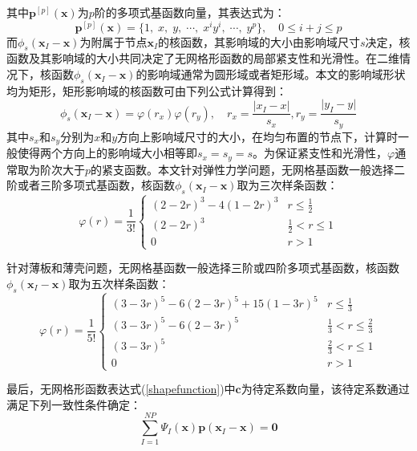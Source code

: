 其中$\pmb{p}^{[p]}(\pmb{x})$为$p$阶的多项式基函数向量，其表达式为：
\begin{equation}
    \pmb{p}^{[p]}(\pmb{x})=\{1,\;x,\;y,\;\dotsb,\;x^iy^i,\;\dotsb,\;y^p\},\quad 0\le i+j \le p
\end{equation}
而$\phi_s(\pmb{x}_I-\pmb{x})$为附属于节点$\pmb{x}_I$的核函数，其影响域的大小由影响域尺寸$s$决定，核函数及其影响域的大小共同决定了无网格形函数的局部紧支性和光滑性。在二维情况下，核函数$\phi_s(\pmb{x}_I-\pmb{x})$的影响域通常为圆形域或者矩形域。本文的影响域形状均为矩形，矩形影响域的核函数可由下列公式计算得到：
\begin{equation}
    \phi_s(\pmb{x}_I-\pmb{x})=\varphi(r_x)\varphi(r_y),\quad r_x=\frac{\lvert x_I-x\rvert}{s_x},r_y=\frac{\lvert y_I-y \rvert}{s_y}
\end{equation}
其中$s_x$和$s_y$分别为$x$和$y$方向上影响域尺寸的大小，在均匀布置的节点下，计算时一般使得两个方向上的影响域大小相等即$s_x=s_y=s$。为保证紧支性和光滑性，$\varphi$通常取为阶次大于$p$的紧支函数。本文针对弹性力学问题，无网格基函数一般选择二阶或者三阶多项式基函数，核函数$\phi_s(\pmb{x}_I-\pmb{x})$取为三次样条函数：
\begin{equation}\label{3B}
    \varphi(r)=\frac{1}{3!}
\begin{cases}
    (2-2r)^3-4(1-2r)^3 &r\le \frac{1}{2}\\
    (2-2r)^3&\frac{1}{2}<r\le 1\\
    0&r>1
\end{cases}
\end{equation}\par
针对薄板和薄壳问题，无网格基函数一般选择三阶或四阶多项式基函数，核函数$\phi_s(\pmb{x}_I-\pmb{x})$取为五次样条函数：
\begin{equation}
        \varphi(r)=\frac{1}{5!}
\begin{cases}
        (3-3r)^5-6(2-3r)^5+15(1-3r)^5&r\le\frac{1}{3}\\
        (3-3r)^5-6(2-3r)^5&\frac{1}{3}<r\le\frac{2}{3}\\
        (3-3r)^5&\frac{2}{3}<r\le1\\
        0&r>1
\end{cases}
\end{equation}\par
最后，无网格形函数表达式(\ref{shapefunction})中$\pmb{c}$为待定系数向量，该待定系数通过满足下列一致性条件确定：
\begin{equation}\label{regeneration conditions}
    \sum_{I=1}^{N\!P}\Psi_I(\pmb{x})\pmb{p}(\pmb{x}_I-\pmb{x})=\pmb{0}
\end{equation}
